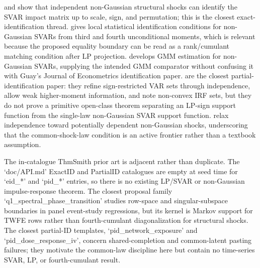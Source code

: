 \documentclass[11pt]{article}
\theoremstyle{definition}
\theoremstyle{plain}
\theoremstyle{remark}
\begin{document}
\citet{GourierouxMonfortRenne2017} and \citet{LanneMeitzSaikkonen2017} show that independent non-Gaussian structural shocks can identify the SVAR impact matrix up to scale, sign, and permutation; this is the closest exact-identification thread.  \citet{Guay2021} gives local statistical identification conditions for non-Gaussian SVARs from third and fourth unconditional moments, which is relevant because the proposed equality boundary can be read as a rank/cumulant matching condition after LP projection.  \citet{LanneLuoto2021} develops GMM estimation for non-Gaussian SVARs, supplying the intended GMM comparator without confusing it with Guay's Journal of Econometrics identification paper.  \citet{DrautzburgWright2023} are the closest partial-identification paper: they refine sign-restricted VAR sets through independence, allow weak higher-moment information, and note non-convex IRF sets, but they do not prove a primitive open-class theorem separating an LP-sign support function from the single-law non-Gaussian SVAR support function.  \citet{LanneLiuLuoto2026} relax independence toward potentially dependent non-Gaussian shocks, underscoring that the common-shock-law condition is an active frontier rather than a textbook assumption.

The in-catalogue ThmSmith prior art is adjacent rather than duplicate.  The `doc/API.md' ExactID and PartialID catalogues are empty at seed time for `eid_*' and `pid_*' entries, so there is no existing LP/SVAR or non-Gaussian impulse-response theorem.  The closest proposal family `q1_spectral_phase_transition' studies row-space and singular-subspace boundaries in panel event-study regressions, but its kernel is Markov support for TWFE rows rather than fourth-cumulant diagonalization for structural shocks.  The closest partial-ID templates, `pid_network_exposure' and `pid_dose_response_iv', concern shared-completion and common-latent pasting failures; they motivate the common-law discipline here but contain no time-series SVAR, LP, or fourth-cumulant result.
\end{document}
